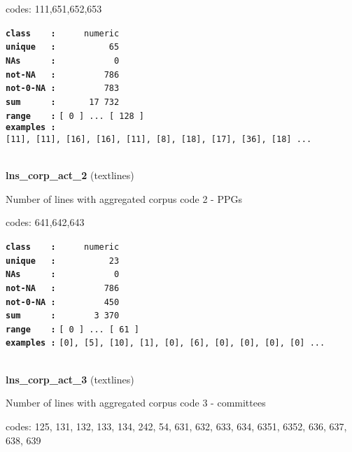 \documentclass[]{article}
\begin{document}
codes: 111,651,652,653

\textbf{\texttt{class\ \ \ \ :}} \texttt{~~~~~numeric}\\
\textbf{\texttt{unique\ \ \ :}} \texttt{~~~~~~~~~~65}\\
\textbf{\texttt{NAs\ \ \ \ \ \ :}} \texttt{~~~~~~~~~~~0}\\
\textbf{\texttt{not-NA\ \ \ :}} \texttt{~~~~~~~~~786}\\
\textbf{\texttt{not-0-NA\ :}} \texttt{~~~~~~~~~783}\\
\textbf{\texttt{sum\ \ \ \ \ \ :}} \texttt{~~~~~~17~732}\\
\textbf{\texttt{range\ \ \ \ :}}
\texttt{{[}\ 0\ {]}\ ...\ {[}\ 128\ {]}}\\
\textbf{\texttt{examples\ :}}
\texttt{{[}11{]},\ {[}11{]},\ {[}16{]},\ {[}16{]},\ {[}11{]},\ {[}8{]},\ {[}18{]},\ {[}17{]},\ {[}36{]},\ {[}18{]}\ ...}\\

~

\textbf{lns\_corp\_act\_2} (textlines)

Number of lines with aggregated corpus code 2 - PPGs

codes: 641,642,643

\textbf{\texttt{class\ \ \ \ :}} \texttt{~~~~~numeric}\\
\textbf{\texttt{unique\ \ \ :}} \texttt{~~~~~~~~~~23}\\
\textbf{\texttt{NAs\ \ \ \ \ \ :}} \texttt{~~~~~~~~~~~0}\\
\textbf{\texttt{not-NA\ \ \ :}} \texttt{~~~~~~~~~786}\\
\textbf{\texttt{not-0-NA\ :}} \texttt{~~~~~~~~~450}\\
\textbf{\texttt{sum\ \ \ \ \ \ :}} \texttt{~~~~~~~3~370}\\
\textbf{\texttt{range\ \ \ \ :}}
\texttt{{[}\ 0\ {]}\ ...\ {[}\ 61\ {]}}\\
\textbf{\texttt{examples\ :}}
\texttt{{[}0{]},\ {[}5{]},\ {[}10{]},\ {[}1{]},\ {[}0{]},\ {[}6{]},\ {[}0{]},\ {[}0{]},\ {[}0{]},\ {[}0{]}\ ...}\\

~

\textbf{lns\_corp\_act\_3} (textlines)

Number of lines with aggregated corpus code 3 - committees

codes: 125, 131, 132, 133, 134, 242, 54, 631, 632, 633, 634, 6351, 6352,
636, 637, 638, 639
\end{document}
